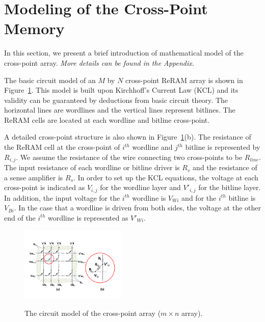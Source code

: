 \section{Modeling of the Cross-Point Memory}\label{sec:model}

In this section, we present a brief introduction of mathematical model of
the cross-point array. \textit{More details can be found in the Appendix.}

The basic circuit model of an $M$ by $N$ cross-point ReRAM array is shown
in Figure~\ref{fig:modeling}. This model is built upon Kirchhoff's Current
Law (KCL) and its validity can be guaranteed by deductions from basic
circuit theory. The horizontal lines are wordlines and the vertical lines
represent bitlines. The ReRAM cells are located at each wordline and
bitline cross-point.

A detailed cross-point structure is also shown in Figure~\ref{fig:modeling}(b). The resistance of the ReRAM cell at the cross-point of $i^{th}$ wordline and
$j^{th}$ bitline is represented by $R_{i,j}$. We assume the resistance of
the wire connecting two cross-points to be $R_{line}$. The input
resistance of each wordline or bitline driver is $R_v$ and the resistance
of a sense amplifier is $R_s$. In order to set up the KCL equations, the
voltage at each cross-point is indicated as $V_{i,j}$ for the wordline layer and $V'_{i,j}$ for the bitline layer. In addition, the input voltage for the $i^{th}$ wordline is $V_{Wi}$ and for the $i^{th}$ bitline is $V_{Bi}$. In the case that a wordline is driven from both sides, the voltage at the other end of the $i^{th}$ wordline is represented as $V'_{Wi}$.


\begin{figure}%
\centering
  \includegraphics[width=0.45\textwidth]{./figures/model_f.pdf}\\
  \caption{The circuit model of the cross-point array ($m\times{n}$ array).}\label{fig:modeling}
  \vspace{-12pt}
\end{figure}

